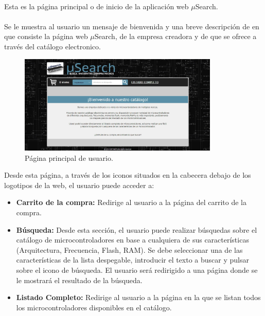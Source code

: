 \paragraph{}Esta es la página principal o de inicio de la aplicación web $\mu$Search.

\paragraph{}Se le muestra al usuario un mensaje de bienvenida y una breve descripción de en que consiste la página web $\mu$Search, de la empresa creadora y de que se ofrece a través del catálogo electronico.

\begin{figure}[h!]
	\centering
	\includegraphics[width=0.85\textwidth]{img/principal_user}
	\caption{Página principal de usuario.}
	\label{fig:principal_usuario}
\end{figure}

Desde esta página, a través de los iconos situados en la cabecera debajo de los logotipos de la web, el usuario puede acceder a:
\begin{itemize}
	\item\textbf{Carrito de la compra:} Redirige al usuario a la página del carrito de la compra.
	
	\item \textbf{Búsqueda:} Desde esta sección, el usuario puede realizar búsquedas sobre el catálogo de microcontroladores en base a cualquiera de sus características (Arquitectura, Frecuencia, Flash, RAM). Se debe seleccionar una de las características de la lista despegable, introducir el texto a buscar y pulsar sobre el icono de búsqueda.
	El usuario será redirigido a una página donde se le mostrará el resultado de la búsqueda.
	
	\item \textbf{Listado Completo:} Redirige al usuario a la página en la que se listan todos los microcontroladores disponibles en el catálogo.
	
\end{itemize}